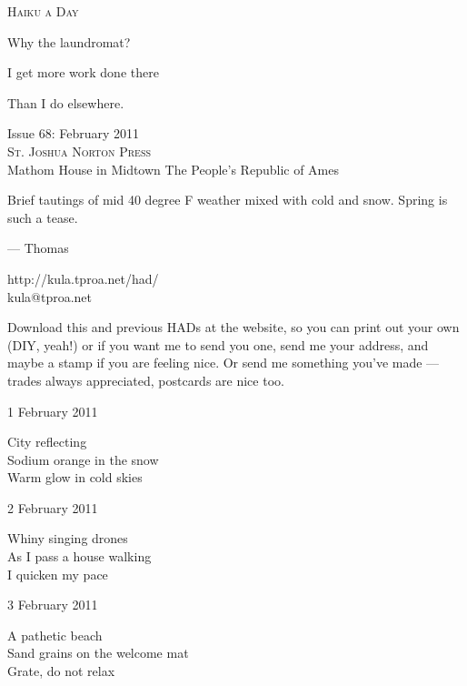 \documentclass[12pt]{article}
\begin{document}
\begin{center}
{\fontsize{36}{48}\selectfont \textsc{Haiku a Day }}
\end{center}

\vspace*{3.5cm}

{\fontsize{20}{40}\selectfont 


Why the laundromat?

I get more work done there

Than I do elsewhere.

}

\vspace*{5.0cm}
\begin{center}
{\large{Issue 68: February 2011}} \\[5mm]
{\fontsize{8}{8}\selectfont  \textsc{ St. Joshua Norton Press }} \\[1mm]
{\fontsize{6}{6}\selectfont Mathom House in Midtown \textbar The People's Republic of Ames }
\end{center}


\newpage

Brief tautings of mid 40 degree F weather mixed with cold and
snow. Spring is such a tease.

--- Thomas

http://kula.tproa.net/had/ \\
kula@tproa.net

Download this and previous HADs at the website, so you can
print out your own (DIY, yeah!) or if you want me to send
you one, send me your address, and maybe a stamp if you
are feeling nice. Or send me something you've made ---
trades always appreciated, postcards are nice too.

\vfill

\newpage

1 February 2011

City reflecting \\
Sodium orange in the snow \\
Warm glow in cold skies

2 February 2011

Whiny singing drones \\
As I pass a house walking \\
I quicken my pace

3 February 2011

A pathetic beach \\
Sand grains on the welcome mat \\
Grate, do not relax
\end{document}
